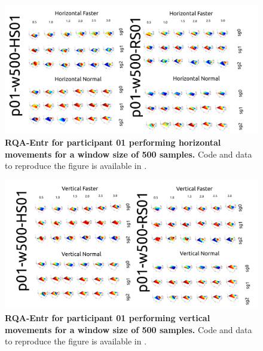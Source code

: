 \documentclass[12pt]{article}
\begin{document}
\newpage
\begin{figure}[ht!]
\centering
\includegraphics{figures/rqa/output/epsilons/rqa-epsilonsp01w500Horizontal}
    	\caption{
	{\bf RQA-Entr for participant 01 performing horizontal movements for a window size of 500 samples.}
	Code and data to reproduce the figure is available in \cite{srep2020}.
        }
    \label{fig-p01-H-w500}
\end{figure}
\begin{figure}[hb!]
\centering
\includegraphics{figures/rqa/output/epsilons/rqa-epsilonsp01w500Vertical}
    	\caption{
	{\bf RQA-Entr for participant 01 performing vertical movements for a window size of 500 samples.}
	Code and data to reproduce the figure is available in \cite{srep2020}.
        }
    \label{fig-p01-V-w500}
\end{figure}
\end{document}

